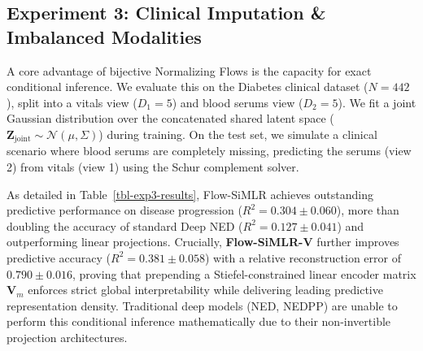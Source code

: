 \documentclass[
  letterpaper,
]{report}
\begin{document}
\subsection{Experiment 3: Clinical Imputation \& Imbalanced
Modalities}\label{experiment-3-clinical-imputation-imbalanced-modalities}

A core advantage of bijective Normalizing Flows is the capacity for
exact conditional inference. We evaluate this on the Diabetes clinical
dataset (\(N=442\)), split into a vitals view (\(D_1=5\)) and blood
serums view (\(D_2=5\)). We fit a joint Gaussian distribution over the
concatenated shared latent space
(\(\mathbf{Z}_{\text{joint}} \sim \mathcal{N}(\mu, \Sigma)\)) during
training. On the test set, we simulate a clinical scenario where blood
serums are completely missing, predicting the serums (view 2) from
vitals (view 1) using the Schur complement solver.

As detailed in Table~\ref{tbl-exp3-results}, Flow-SiMLR achieves
outstanding predictive performance on disease progression
(\(R^2 = 0.304 \pm 0.060\)), more than doubling the accuracy of standard
Deep NED (\(R^2 = 0.127 \pm 0.041\)) and outperforming linear
projections. Crucially, \textbf{Flow-SiMLR-V} further improves
predictive accuracy (\(R^2 = 0.381 \pm 0.058\)) with a relative
reconstruction error of \(0.790 \pm 0.016\), proving that prepending a
Stiefel-constrained linear encoder matrix \(\mathbf{V}_m\) enforces
strict global interpretability while delivering leading predictive
representation density. Traditional deep models (NED, NEDPP) are unable
to perform this conditional inference mathematically due to their
non-invertible projection architectures.
\end{document}
